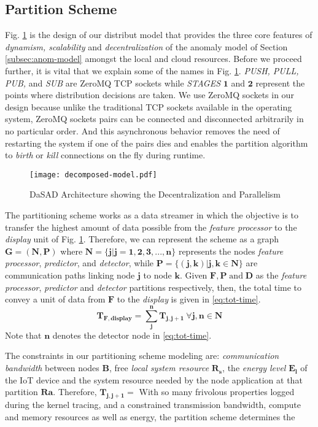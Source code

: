 \subsection{Partition Scheme}
\label{subsec:partition-scheme}
Fig. \ref{fig:distributed-architecture} is the design of our distribut model 
that provides the three core features of \emph{dynamism, scalability} and 
\emph{decentralization} of the anomaly model of Section \ref{subsec:anom-model} 
amongst the local and cloud 
resources. Before we proceed further, it is vital that we explain some of 
the names in Fig. 
\ref{fig:distributed-architecture}. \emph{PUSH, PULL, PUB,} and \emph{SUB} are 
ZeroMQ TCP sockets while \emph{STAGES} $ \bm{1} $ and $ \bm{2} $ represent the 
points where distribution decisions are taken. We use ZeroMQ sockets in our 
design 
because unlike the traditional TCP sockets available in the operating system, 
ZeroMQ sockets pairs can be connected and disconnected arbitrarily in no 
particular order. And this asynchronous behavior removes 
the need of restarting the system if one of the pairs dies and enables the 
partition algorithm to \emph{birth} or \emph{kill} connections on the fly 
during runtime.
\begin{figure}[!t]
	\centering
	\texttt{[image: decomposed-model.pdf]}
	\caption{D\MakeLowercase{a}SAD Architecture showing the Decentralization 
	and Parallelism}
	\label{fig:distributed-architecture}
\end{figure}
\par
The partitioning scheme works as a data streamer in which the objective is to 
transfer the highest amount of data possible from the \emph{feature processor} 
to the \emph{display} unit of Fig. \ref{fig:distributed-architecture}. 
Therefore, we can represent the scheme as a graph $ 
\bm{G}=\bm{\left(N,P\right)} 
$ where $ \bm{N} = \bm{\lbrace j|j=1,2,3,...,n\rbrace} $ represents the nodes 
\emph{feature processor}, \emph{predictor}, and \emph{detector}, while $ 
\bm{P}=\bm{\lbrace \left(j,k\right)|j,k \in N \rbrace } $ are communication 
paths linking node $ \bm{j} $ to node $ \bm{k} $. Given $ \bm{F}, \bm{P} \; 
\text{and} \; \bm{D}  $ as the \emph{feature processor}, \emph{predictor} and 
\emph{detector} partitions respectively, then, the total time to convey a unit 
of data from $ \bm{F} $ to the \emph{display} is given in \eqref{eq:tot-time}.
\begin{equation}
	\label{eq:tot-time}
	\bm{T_{F,display}}= \bm {\sum_{j}^{n} T_{j,j+1}} \: \forall \bm{j}, \bm{n} 
	\in \bm{N}
\end{equation}
Note that $ \bm{n} $ denotes the detector node in \eqref{eq:tot-time}. \par
The constraints in our partitioning scheme modeling are: \emph{communication 
bandwidth} between nodes $ \bm{B} $, free \emph{local system resource} $ 
\bm{R_s} $, the \emph{energy level} $ \bm{E_l} $ of the IoT device and the 
system resource needed by the node application at that partition $ \bm{Ra} $.   
Therefore, $ \bm{T_{j,j+1}} =   $
With so many frivolous properties logged  during the kernel tracing, and a  
constrained transmission bandwidth, compute and memory resources as well 
as energy, the partition scheme determines the 
 
